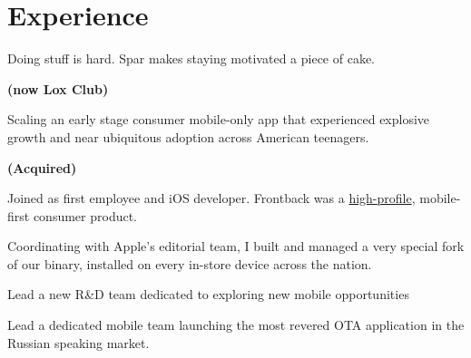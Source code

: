 \documentclass[]{plushcv}
\begin{document}




\begin{minipage}[t]{0.74\textwidth} 

\section{Experience}
\vspace{\topsep} 
\begin{tightemize}
\sectionsep
\item Doing stuff is hard. Spar makes staying motivated a piece of cake.
\end{tightemize}
\sectionsep

 \textbf{(now Lox Club)}
\begin{tightemize}
\sectionsep
\item Scaling an early stage consumer mobile-only app that experienced explosive growth and near ubiquitous adoption across American teenagers.
\end{tightemize}
\sectionsep

 \textbf{(Acquired)}
\begin{tightemize}
\item Joined as first employee and iOS developer. Frontback was a \href{https://techcrunch.com/tag/frontback/}{high-profile}, mobile-first consumer product.
\item Coordinating with Apple's editorial team, I built and managed a very special fork of our binary, installed on every in-store device across the nation.
\end{tightemize}
\sectionsep

\begin{tightemize}
\item Lead a new R\&D team dedicated to exploring new mobile opportunities
\item Lead a dedicated mobile team launching the most revered OTA application in the Russian speaking market.
\end{tightemize}
\sectionsep


\end{minipage}
\end{document}
